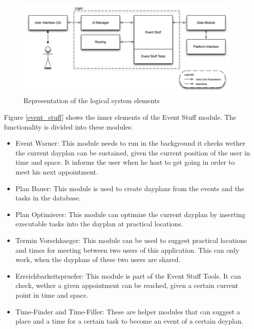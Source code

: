 \begin{figure}[h!]
\centering
\includegraphics[width=16cm]{pics/logic.png}
\caption{Representation of the logical system elements}
\label{logic}
\end{figure}
Figure  \ref{event_stuff} shows the inner elements of the Event Stuff module. The functionality is divided into these modules:
\begin{itemize}
\item Event Warner: This module needs to run in the background it checks wether the current dayplan can be sustained, given the current position of the user in time and space. It informs the user when he hast to get going in order to meet his next appointment.
\item Plan Bauer: This module is used to create dayplans from the events and the tasks in the database.
\item Plan Optimierer: This module can optimize the current dayplan by inserting executable tasks into the dayplan at practical locations.
\item Termin Vorschkaeger: This module can be used to suggest practical locations and times for meeting between two users of this application. This can only work, when the dayplans of these two users are shared.
\item Erreichbarkeitspruefer: This module is part of the Event Stuff Tools. It can check, wether a given appointment can be reached, given a certain current point in time and space.
\item Time-Finder and Time-Filler: These are helper modules that can suggest a place and a time for a certain task to become an event of a certain deyplan. 
\end{itemize}

